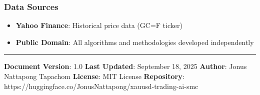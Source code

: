 \subsubsection{Data Sources}\label{data-sources}

\begin{itemize}
\tightlist
\item
  \textbf{Yahoo Finance}: Historical price data (GC=F ticker)
\item
  \textbf{Public Domain}: All algorithms and methodologies developed
  independently
\end{itemize}

\begin{center}\rule{0.5\linewidth}{0.5pt}\end{center}

\textbf{Document Version}: 1.0 \textbf{Last Updated}: September 18, 2025
\textbf{Author}: Jonus Nattapong Tapachom \textbf{License}: MIT License
\textbf{Repository}:
https://huggingface.co/JonusNattapong/xauusd-trading-ai-smc
